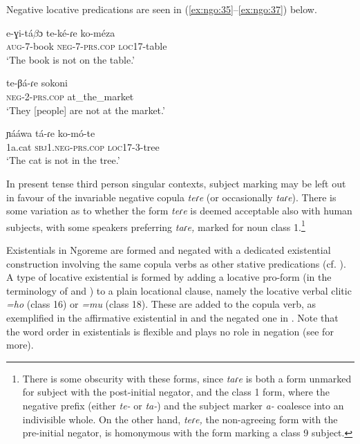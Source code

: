 \documentclass[output=paper,colorlinks,citecolor=brown,draftmode]{langscibook}
\begin{document}
Negative locative predications are seen in (\ref{ex:ngo:35}--\ref{ex:ngo:37}) below.

\ea\label{ex:ngo:35} 
    \gll e-ɣi-tá$\beta ɔ$ te-ké-ɾe ko-méza \\ 
        \textsc{aug-}7-book \textsc{neg}{}-7-\textsc{prs.cop} \textsc{loc17}{}-table\\
    \glt ‘The book is not on the table.’
\z 

\ea\label{ex:ngo:36} 
    \gll te-βá-ɾe sokoni\\ 
        \textsc{neg}{}-2-\textsc{prs.cop} at\_the\_market\\
    \glt ‘They [people] are not at the market.’
\z 

\ea\label{ex:ngo:37} 
    \gll ɲááwa tá-ɾe ko-mó-te\\ 
     1a.cat \textsc{sbj}1.\textsc{neg-}\textsc{prs.cop} \textsc{loc17}{}-3-tree\\
    \glt ‘The cat is not in the tree.’
\z 

In present tense third person singular contexts, subject marking may be left out in favour of the invariable negative copula \textit{teɾe} (or occasionally \textit{taɾe}). There is some variation as to whether the form \textit{teɾe} is deemed acceptable also with human subjects, with some speakers preferring \textit{taɾe,} marked for noun class 1.\footnote{There is some obscurity with these forms, since \textit{taɾe} is both a form unmarked for subject with the post-initial negator, and the class 1 form, where the negative prefix (either \textit{te-} or \textit{ta-}) and the subject marker \textit{a-} coalesce into an indivisible whole. On the other hand, \textit{teɾe,} the non-agreeing form with the pre-initial negator, is homonymous with the form marking a class 9 subject.} 

Existentials in Ngoreme are formed and negated with a dedicated existential construction involving the same copula verbs as other stative predications (cf. \citealt{BernanderLaine2020}). A type of locative existential is formed by adding a locative pro{}-form (in the terminology of \citealt{BentleyEtAl2013} and \citealt{Bentley2017}) to a plain locational clause, namely the locative verbal clitic \textit{=ho} (class 16) or \textit{=mu} (class 18). These are added to the copula verb, as exemplified in the affirmative existential in  and the negated one in . Note that the word order in existentials is flexible and plays no role in negation (see \citealt{BernanderLaine2020} for more).
\end{document}
